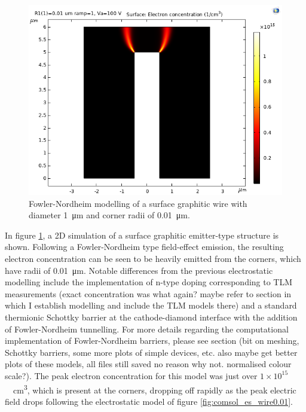 \begin{refsection}
\begin{figure}[H]
    \centering
    \includegraphics[width=\textwidth]{Chapter7/Figs/Raster/FN radius 0.01 width 1um 100V 0V.png}
    \caption{Fowler-Nordheim modelling of a surface graphitic wire with diameter 1~\si{\micro\metre} and corner radii of 0.01~\si{\micro\metre}.}
    \label{fig:comsol_fn_wire0.01}
\end{figure}

In figure \ref{fig:comsol_fn_wire0.01}, a 2D simulation of a surface graphitic emitter-type structure is shown. Following a Fowler-Nordheim type field-effect emission, the resulting electron concentration can be seen to be heavily emitted from the corners, which have radii of 0.01~\si{\micro\metre}. Notable differences from the previous electrostatic modelling include the implementation of n-type doping corresponding to TLM measurements (exact concentration was what again? maybe refer to section in which I establish modelling and include the TLM models there) and a standard thermionic Schottky barrier at the cathode-diamond interface with the addition of Fowler-Nordheim tunnelling. For more details regarding the computational implementation of Fowler-Nordheim barriers, please see section (bit on meshing, Schottky barriers, some more plots of simple devices, etc. also maybe get better plots of these models, all files still saved no reason why not. normalised colour scale?). The peak electron concentration for this model was just over $1\times10^{15}$~\si{\per\centi\metre\cubed}, which is present at the corners, dropping off rapidly as the peak electric field drops following the electrostatic model of figure \ref{fig:comsol_es_wire0.01}.


\end{refsection}
